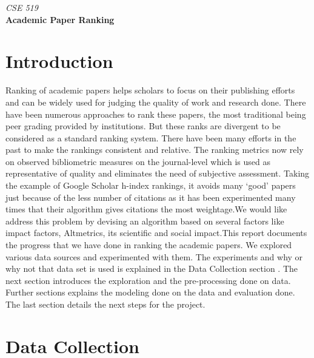 \documentclass[a4paper, 11pt]{article}
\begin{document}
\noindent
\begin{center}
      \large\textit{CSE 519}\\
      \Large\textbf{Academic Paper Ranking}\\
\end{center}
\section*{Introduction}
Ranking of academic papers helps scholars to focus on their publishing efforts and can
be widely used for judging the quality of work and research done. There have been numerous approaches to rank these papers, the most traditional being peer grading provided by institutions. But these ranks are divergent to be considered as a standard ranking system. There have been many efforts in the past to make the rankings consistent and relative. The ranking metrics now rely on observed bibliometric measures on the journal-level which is used as representative of quality and eliminates the need of subjective assessment. Taking the example of Google Scholar h-index rankings, it avoids many ‘good’ papers just because of the less number of
citations as it has been experimented many times that their algorithm gives citations the most weightage.We would like address this problem by
devising an algorithm based on several factors like impact factors, Altmetrics, its
scientific and social impact.This report documents the progress that we have done in ranking the academic papers. We explored various data sources and experimented with them. The experiments and why or why not that data set is used is explained in the Data Collection section
. The next section introduces the exploration and the pre-processing done on data. Further sections explains the modeling done on the data and evaluation done. The last section details the next steps for the project.

\section*{Data Collection}
\end{document}
